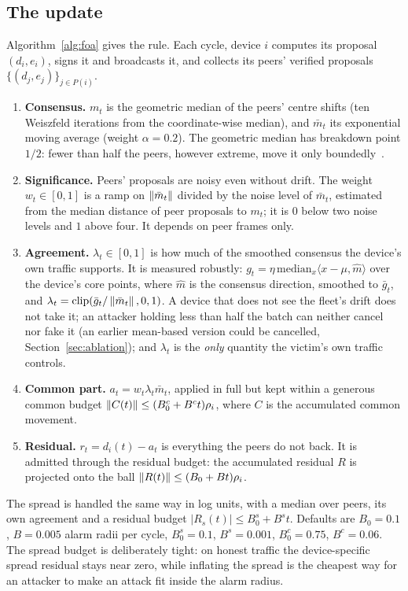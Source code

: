 \subsection{The update}
Algorithm~\ref{alg:foa} gives the rule. Each cycle, device $i$ computes its proposal $(d_i,e_i)$, signs
it and broadcasts it, and collects its peers' verified proposals $\{(d_j,e_j)\}_{j\in P(i)}$.
\begin{enumerate}
\item \textbf{Consensus.} $m_t$ is the geometric median of the peers' centre shifts (ten Weiszfeld
  iterations from the coordinate-wise median), and $\bar m_t$ its exponential moving average (weight
  $\alpha=0.2$). The geometric median has breakdown point $1/2$: fewer than half the peers, however
  extreme, move it only boundedly~\cite{lopuhaa,minsker}.
\item \textbf{Significance.} Peers' proposals are noisy even without drift. The weight $w_t\in[0,1]$ is
  a ramp on $\left\lVert \bar m_t \right\rVert$ divided by the noise level of $\bar m_t$, estimated from the median distance
  of peer proposals to $m_t$; it is $0$ below two noise levels and $1$ above four. It depends on peer
  frames only.
\item \textbf{Agreement.} $\lambda_t\in[0,1]$ is how much of the smoothed consensus the device's own
  traffic supports. It is measured robustly: $g_t=\eta\,\mathrm{median}_x\langle x-\mu,\hat m\rangle$ over the
  device's core points, where $\hat m$ is the consensus direction, smoothed to $\bar g_t$, and
  $\lambda_t=\mathrm{clip}(\bar g_t/\left\lVert \bar m_t \right\rVert,0,1)$. A device that does not see the fleet's drift
  does not take it; an attacker holding less than half the batch can neither cancel nor fake it (an earlier
  mean-based version could be cancelled, Section~\ref{sec:ablation}); and $\lambda_t$ is the \emph{only}
  quantity the victim's own traffic controls.
\item \textbf{Common part.} $a_t = w_t\lambda_t\bar m_t$, applied in full but kept within a generous
  common budget $\left\lVert C(t) \right\rVert\le (B_0^c+B^c t)\rho_i$, where $C$ is the accumulated common movement.
\item \textbf{Residual.} $r_t = d_i(t)-a_t$ is everything the peers do not back. It is admitted through
  the residual budget: the accumulated residual $R$ is projected onto the ball
  $\left\lVert R(t) \right\rVert\le (B_0+Bt)\rho_i$.
\end{enumerate}
The spread is handled the same way in log units, with a median over peers, its own agreement and a
residual budget $|R_s(t)|\le B_0^s+B^s t$. Defaults are $B_0=0.1$, $B=0.005$ alarm radii per cycle,
$B_0^s=0.1$, $B^s=0.001$, $B_0^c=0.75$, $B^c=0.06$. The spread budget is deliberately tight: on honest
traffic the device-specific spread residual stays near zero, while inflating the spread is the cheapest
way for an attacker to make an attack fit inside the alarm radius.

